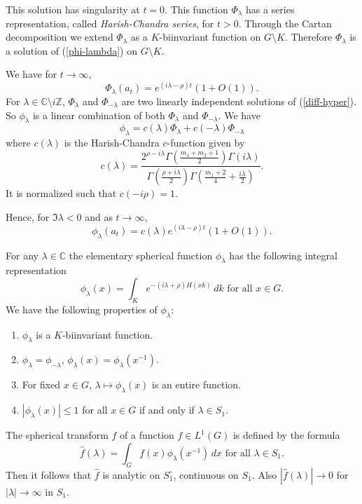 \documentclass[11pt,reqno]{amsart}
\newcommand{\what}{\widehat}%
\newcommand{\C}{\mathbb C}%
\newcommand{\Z}{\mathbb Z}%
\theoremstyle{definition}
\theoremstyle{definition}
\numberwithin{equation}{section}
\begin{document}
This solution has singularity at $t=0$. This function $\Phi_\lambda$ has a series representation, called {\em Harish-Chandra series}, for $t>0$. Through the Cartan decomposition we extend $\Phi_\lambda$ as a $K$-biinvariant function on $G\setminus K$. Therefore $\Phi_\lambda$ is a solution of (\ref{phi-lambda}) on $G\setminus K$.


We have for $t\rightarrow\infty$, \begin{equation}\label{est-Phi}
\Phi_\lambda(a_t)=e^{(i\lambda-\rho)t}(1 + O(1)).
\end{equation}
For $\lambda\in \C\setminus i\Z$, $\Phi_\lambda$ and $\Phi_{-\lambda}$ are two linearly independent solutions of (\ref{diff-hyper}). So $\phi_\lambda$ is a linear combination of both $\Phi_\lambda$ and $\Phi_{-\lambda}$. We have $$\phi_\lambda=c(\lambda)\Phi_\lambda + c(-\lambda)\Phi_{-\lambda}$$ where $c(\lambda)$ is the Harish-Chandra $c$-function given by $$c(\lambda)=\frac{2^{\rho-i\lambda} \Gamma(\frac{m_1 + m_2 +1}{2})\Gamma(i\lambda)}{\Gamma(\frac{\rho+ i\lambda}{2}) \Gamma(\frac{m_1+ 2}{4} + \frac{i\lambda}{2})}.$$
It is normalized such that $c(-i\rho)=1$.

Hence, for $\Im\lambda<0$ and as $t\rightarrow\infty$, 
\begin{equation}\label{est-phi}
\phi_\lambda(a_t)=c(\lambda)e^{(i\lambda-\rho)t}(1 + O(1)).
\end{equation}




For any $\lambda\in \C$  the elementary spherical function $\phi_\lambda$ has the following integral representation
$$\phi_\lambda(x)=\int_K e^{-(i\lambda+\rho)H(xk)}\,dk \text{ for all } x\in G.$$ We have the following properties of $\phi_\lambda$:
\begin{enumerate}
\item $\phi_\lambda$ is a $K$-biinvariant function.
\item $\phi_\lambda=\phi_{-\lambda}$, $\phi_\lambda(x)=\phi_\lambda(x^{-1})$. 
\item For fixed $x\in G$, $\lambda\mapsto\phi_\lambda(x)$ is an entire function. 
\item $|\phi_\lambda(x)|\leq 1$ for all $x\in G$ if and only if $\lambda\in S_1$.

\end{enumerate}
The spherical transform $\what{f}$ of a function $f\in L^1(G)$ is defined by the formula
$$\what{f}(\lambda)=\int_Gf(x)\phi_\lambda(x^{-1})\,dx \text{ for all } \lambda\in S_1.$$
Then it follows that $\what{f}$ is  analytic on $S_1^\circ$, continuous on $S_1$. Also $|\what{f}(\lambda)|\rightarrow 0$ for $|\lambda|\rightarrow\infty$ in $S_1$.
\end{document}

